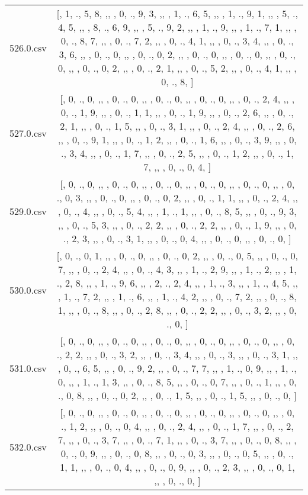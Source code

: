 \begin{table}[ht]
\begin{tabular}{@{}c c@{}}
	526.0.csv & [, 1, ., 5, 8, ,,  , 0, ., 9, 3, ,,  , 1, ., 6, 5, ,,  , 1, ., 9, 1, ,,  , 5, ., 4, 5, ,,  , 8, ., 6, 9, ,,  , 5, ., 9, 2, ,,  , 1, ., 9, ,,  , 1, ., 7, 1, ,,  , 0, ., 8, 7, ,,  , 0, ., 7, 2, ,,  , 0, ., 4, 1, ,,  , 0, ., 3, 4, ,,  , 0, ., 3, 6, ,,  , 0, ., 0, ,,  , 0, ., 0, 2, ,,  , 0, ., 0, ,,  , 0, ., 0, ,,  , 0, ., 0, ,,  , 0, ., 0, 2, ,,  , 0, ., 2, 1, ,,  , 0, ., 5, 2, ,,  , 0, ., 4, 1, ,,  , 0, ., 8, ]\\ 
	527.0.csv & [, 0, ., 0, ,,  , 0, ., 0, ,,  , 0, ., 0, ,,  , 0, ., 0, ,,  , 0, ., 2, 4, ,,  , 0, ., 1, 9, ,,  , 0, ., 1, 1, ,,  , 0, ., 1, 9, ,,  , 0, ., 2, 6, ,,  , 0, ., 2, 1, ,,  , 0, ., 1, 5, ,,  , 0, ., 3, 1, ,,  , 0, ., 2, 4, ,,  , 0, ., 2, 6, ,,  , 0, ., 9, 1, ,,  , 0, ., 1, 2, ,,  , 0, ., 1, 6, ,,  , 0, ., 3, 9, ,,  , 0, ., 3, 4, ,,  , 0, ., 1, 7, ,,  , 0, ., 2, 5, ,,  , 0, ., 1, 2, ,,  , 0, ., 1, 7, ,,  , 0, ., 0, 4, ]\\ 
	529.0.csv & [, 0, ., 0, ,,  , 0, ., 0, ,,  , 0, ., 0, ,,  , 0, ., 0, ,,  , 0, ., 0, ,,  , 0, ., 0, 3, ,,  , 0, ., 0, ,,  , 0, ., 0, 2, ,,  , 0, ., 1, 1, ,,  , 0, ., 2, 4, ,,  , 0, ., 4, ,,  , 0, ., 5, 4, ,,  , 1, ., 1, ,,  , 0, ., 8, 5, ,,  , 0, ., 9, 3, ,,  , 0, ., 5, 3, ,,  , 0, ., 2, 2, ,,  , 0, ., 2, 2, ,,  , 0, ., 1, 9, ,,  , 0, ., 2, 3, ,,  , 0, ., 3, 1, ,,  , 0, ., 0, 4, ,,  , 0, ., 0, ,,  , 0, ., 0, ]\\ 
	530.0.csv & [, 0, ., 0, 1, ,,  , 0, ., 0, ,,  , 0, ., 0, 2, ,,  , 0, ., 0, 5, ,,  , 0, ., 0, 7, ,,  , 0, ., 2, 4, ,,  , 0, ., 4, 3, ,,  , 1, ., 2, 9, ,,  , 1, ., 2, ,,  , 1, ., 2, 8, ,,  , 1, ., 9, 6, ,,  , 2, ., 2, 4, ,,  , 1, ., 3, ,,  , 1, ., 4, 5, ,,  , 1, ., 7, 2, ,,  , 1, ., 6, ,,  , 1, ., 4, 2, ,,  , 0, ., 7, 2, ,,  , 0, ., 8, 1, ,,  , 0, ., 8, ,,  , 0, ., 2, 8, ,,  , 0, ., 2, 2, ,,  , 0, ., 3, 2, ,,  , 0, ., 0, ]\\ 
	531.0.csv & [, 0, ., 0, ,,  , 0, ., 0, ,,  , 0, ., 0, ,,  , 0, ., 0, ,,  , 0, ., 0, ,,  , 0, ., 2, 2, ,,  , 0, ., 3, 2, ,,  , 0, ., 3, 4, ,,  , 0, ., 3, ,,  , 0, ., 3, 1, ,,  , 0, ., 6, 5, ,,  , 0, ., 9, 2, ,,  , 0, ., 7, 7, ,,  , 1, ., 0, 9, ,,  , 1, ., 0, ,,  , 1, ., 1, 3, ,,  , 0, ., 8, 5, ,,  , 0, ., 0, 7, ,,  , 0, ., 1, ,,  , 0, ., 0, 8, ,,  , 0, ., 0, 2, ,,  , 0, ., 1, 5, ,,  , 0, ., 1, 5, ,,  , 0, ., 0, ]\\ 
	532.0.csv & [, 0, ., 0, ,,  , 0, ., 0, ,,  , 0, ., 0, ,,  , 0, ., 0, ,,  , 0, ., 0, ,,  , 0, ., 1, 2, ,,  , 0, ., 0, 4, ,,  , 0, ., 2, 4, ,,  , 0, ., 1, 7, ,,  , 0, ., 2, 7, ,,  , 0, ., 3, 7, ,,  , 0, ., 7, 1, ,,  , 0, ., 3, 7, ,,  , 0, ., 0, 8, ,,  , 0, ., 0, 9, ,,  , 0, ., 0, 8, ,,  , 0, ., 0, 3, ,,  , 0, ., 0, 5, ,,  , 0, ., 1, 1, ,,  , 0, ., 0, 4, ,,  , 0, ., 0, 9, ,,  , 0, ., 2, 3, ,,  , 0, ., 0, 1, ,,  , 0, ., 0, ]\\ 

\end{tabular}
\end{table}
